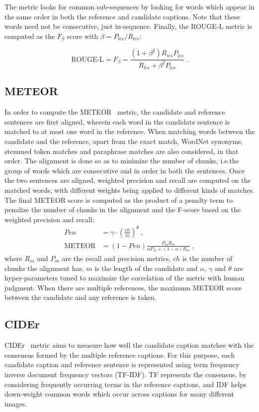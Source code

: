 The metric looks for common sub-sequences by looking for words which appear in the
same order in both the reference and candidate captions.
Note that these words need not be consecutive, just in-sequence.
Finally, the ROUGE-L metric is computed as the $F_\beta$ score with $\beta =
P_{lcs}/R_{lcs}$:

\begin{equation}
        \text{ROUGE-L} = F_{\beta} = \frac{(1+\beta^2)R_{ics}P_{lcs}}{R_{lcs}+ \beta^2 P_{lcs}} \; .
\end{equation}

\subsection{METEOR}
In order to compute the METEOR~\cite{denkowski-lavie:2014:Meteor} metric, the
candidate and reference sentences are first aligned, wherein each word in the
candidate sentence is matched to at most one word in the reference.
When matching words between the candidate and the reference, apart from the
exact match, WordNet synonyms, stemmed token matches and paraphrase matches are
also considered, in that order.
The alignment is done so as to minimize the number of chunks, i.e.\@ the group of
words which are consecutive and in order in both the sentences.
Once the two sentences are aligned, weighted precision and recall are computed
on the matched words, with different weights being applied to different kinds of
matches.
The final METEOR score is computed as the product of a penalty term to penalize the
number of chunks in the alignment and the F-score based on the weighted
precision and recall:
\begin{align}
        Pen &= \gamma\cdot\left(\frac{ch}{m}\right)^\theta \; ,\\[0.75ex]
        \text{METEOR} &= (1-Pen)\frac{P_m R_m}{\alpha{}P_m+(1-\alpha)R_m} \; ,
\end{align}
\noindent where $R_m$ and $P_m$ are the recall and precision metrics, $ch$ is
the number of chunks the alignment has, $m$ is the length of the candidate and
$\alpha$, $\gamma$ and $\theta$ are hyper-parameters tuned to maximize the
correlation of the metric with human judgment.
When there are multiple references, the maximum METEOR score between the
candidate and any reference is taken.

\subsection{CIDEr}
CIDEr~\cite{Vedantam_2015_CVPR} metric aims to measure how well the candidate
caption matches with the consensus formed by the multiple reference captions.
For this purpose, each candidate caption and reference sentence is represented
using term frequency inverse document frequency vectors (TF-IDF).
TF represents the consensus, by considering frequently occurring terms in
the reference captions, and IDF helps down-weight common words which occur across
captions for many different images.

